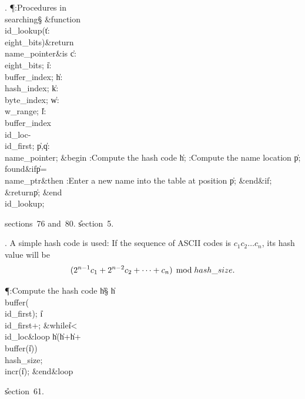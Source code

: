 . \P\?:Procedures in \\{searching}\X\S\?\6
\&{function}\8\1\\{id\_lookup}\?(\1\?\|t\?:\?\\{eight\_bits}\?\2)\&{return}\?\8%
\\{name\_pointer}\2\8\&{is}\8\1\6
\|c\?:\?\\{eight\_bits};\6
\|i\?:\?\\{buffer\_index};\6
\|h\?:\?\\{hash\_index};\6
\|k\?:\?\\{byte\_index};\6
\|w\?:\?\\{w\_range};\6
\|l\?:\?\\{buffer\_index}\?\K\?\\{id\_loc}\?-\?\\{id\_first};\6
\|p\?,\?\|q\?:\?\\{name\_pointer};\6
\4\&{begin}\6
:Compute the hash code \|h\X;\6
:Compute the name location \|p\X;\6
\4\BL\\{found}\EL\8\&{if}\1\1\8\|p\?=\?\\{name\_ptr}\2\8\&{then}\6
:Enter a new name into the table at position \|p\X;\2\6
\&{end}\8\2\&{if}\1;\6
\?\&{return}\?\8\|p;\2\6
\&{end}\8\\{id\_lookup};\par
\A sections~76 and~80.
\U section~5\*.\fi

. A simple hash code is used: If the sequence of
ASCII codes is $c_1c_2\ldots c_n$, its hash value will be
$$(2^{n-1}c_1+2^{n-2}c_2+\cdots+c_n)\,\bmod\,\\{hash\_size}.$$

\Y\P\?\4:Compute the hash code \|h\X\S\?\6
\|h\?\K\?\\{buffer}\?\1(\?\\{id\_first}\?\2)\?;\5
\|i\?\K\?\\{id\_first}\?+;\6
\1\&{while}\8\|i\?<\?\\{id\_loc}\8\&{loop}\6
\|h\?\K\1(\?\|h\?+\?\|h\?+\?\\{buffer}\?\1(\?\|i\?\2)\2)\?%
\\{hash\_size};\5
\\{incr}\?\1(\?\|i\?\2)\?;\2\6
\&{end}\8\&{loop}\par
\U section~61.\fi

